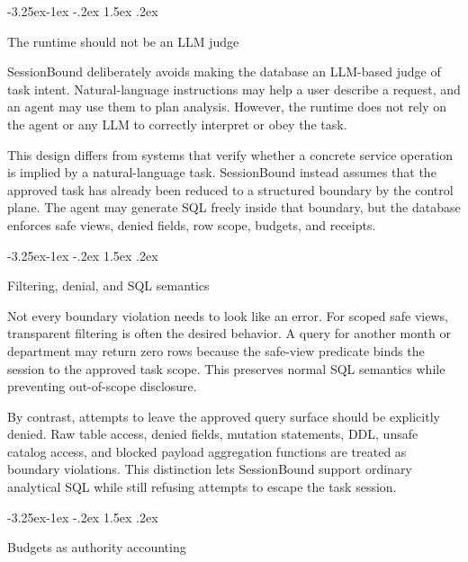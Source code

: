 \documentclass[10pt,twocolumn]{article}
\makeatletter
\renewcommand\subsection{\@startsection{subsection}{2}{\z@}%
  {-3.25ex\@plus -1ex \@minus -.2ex}%
  {1.5ex \@plus .2ex}%
  {\normalfont\large\bfseries\raggedright}}
\makeatother
\begin{document}
\hypertarget{the-runtime-should-not-be-an-llm-judge}{%
\subsection{The runtime should not be an LLM
judge}\label{the-runtime-should-not-be-an-llm-judge}}

SessionBound deliberately avoids making the database an LLM-based judge
of task intent. Natural-language instructions may help a user describe a
request, and an agent may use them to plan analysis. However, the
runtime does not rely on the agent or any LLM to correctly interpret or
obey the task.

This design differs from systems that verify whether a concrete service
operation is implied by a natural-language task. SessionBound instead
assumes that the approved task has already been reduced to a structured
boundary by the control plane. The agent may generate SQL freely inside
that boundary, but the database enforces safe views, denied fields, row
scope, budgets, and receipts.

\hypertarget{filtering-denial-and-sql-semantics}{%
\subsection{Filtering, denial, and SQL
semantics}\label{filtering-denial-and-sql-semantics}}

Not every boundary violation needs to look like an error. For scoped
safe views, transparent filtering is often the desired behavior. A query
for another month or department may return zero rows because the
safe-view predicate binds the session to the approved task scope. This
preserves normal SQL semantics while preventing out-of-scope disclosure.

By contrast, attempts to leave the approved query surface should be
explicitly denied. Raw table access, denied fields, mutation statements,
DDL, unsafe catalog access, and blocked payload aggregation functions
are treated as boundary violations. This distinction lets SessionBound
support ordinary analytical SQL while still refusing attempts to escape
the task session.

\hypertarget{budgets-as-authority-accounting}{%
\subsection{Budgets as authority
accounting}\label{budgets-as-authority-accounting}}
\end{document}
